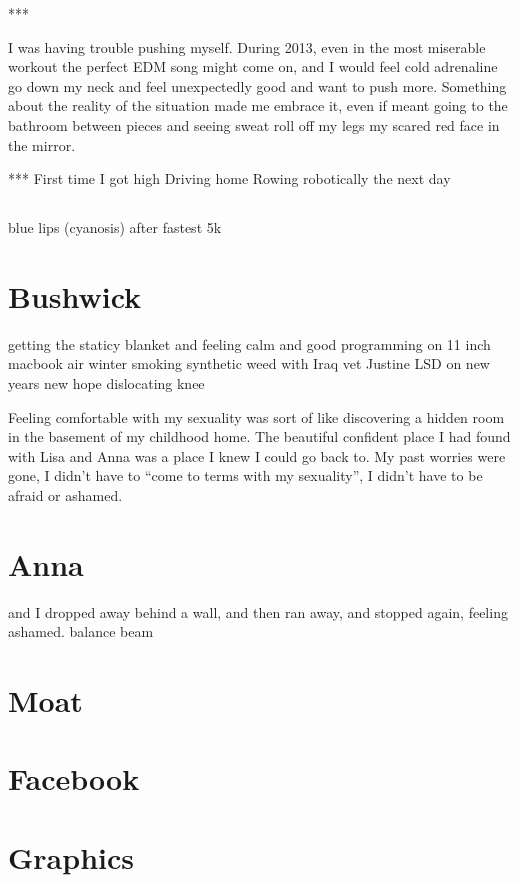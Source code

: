 ***

I was having trouble pushing myself.  During 2013, even in the most miserable
workout the perfect EDM song might come on, and I would feel cold adrenaline go
down my neck and feel unexpectedly good and want to push more.  Something about
the reality of the situation made me embrace it, even if meant going to the
bathroom between pieces and seeing sweat roll off my legs my scared red face in
the mirror.  

***
First time I got high
Driving home
Rowing robotically the next day

\section{}
blue lips (cyanosis) after fastest 5k

\chapter{Bushwick}
getting the staticy blanket and feeling calm and good
programming on 11 inch macbook air
winter
smoking synthetic weed with Iraq vet
Justine
LSD on new years
new hope
dislocating knee

Feeling comfortable with my sexuality was sort of like discovering a hidden room
in the basement of my childhood home.  The beautiful confident place I had found
with Lisa and Anna was a place I knew I could go back to.  My past worries were
gone, I didn't have to ``come to terms with my sexuality'', I didn't have to be
afraid or ashamed. 

\chapter{Anna}
and I dropped away behind a wall, and then ran away, and stopped again, feeling ashamed.
balance beam

\chapter{Moat}


\chapter{Facebook}


\chapter{Graphics}


